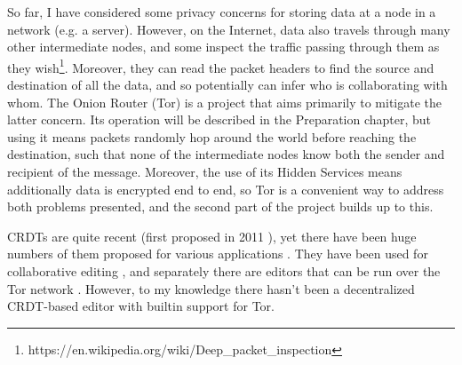 \documentclass[diss.tex]{subfiles}
\begin{document}
So far, I have considered some privacy concerns for storing data at a node in a network (e.g. a server). However, on the Internet, data also travels through many other intermediate nodes, and some inspect the traffic passing through them as they wish\footnote{https://en.wikipedia.org/wiki/Deep\_packet\_inspection}. Moreover, they can read the packet headers to find the source and destination of all the data, and so potentially can infer who is collaborating with whom. The Onion Router (Tor) is a project that aims primarily to mitigate the latter concern. Its operation will be described in the Preparation chapter, but using it means packets randomly hop around the world before reaching the destination, such that none of the intermediate nodes know both the sender and recipient of the message. Moreover, the use of its Hidden Services means additionally data is encrypted end to end, so Tor is a convenient way to address both problems presented, and the second part of the project builds up to this.

CRDTs are quite recent (first proposed in 2011 \cite{crdt}), yet there have been huge numbers of them proposed for various applications \cite{shapstudy}. They have been used for collaborative editing \cite{treedoc, crate, rga, logoot}, and separately there are editors that can be run over the Tor network \cite{fiduswriter}. However, to my knowledge there hasn't been a decentralized CRDT-based editor with builtin support for Tor.
\end{document}
